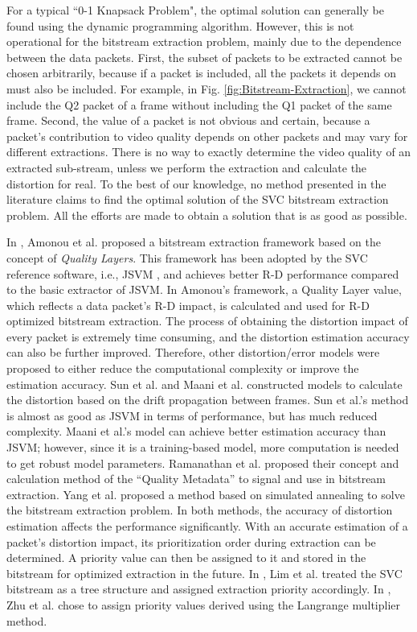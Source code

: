 \documentclass[journal,draftclsnofoot,onecolumn]{IEEEtran}
\begin{document}
For a typical ``0-1 Knapsack Problem", the optimal solution can generally be found using the dynamic programming algorithm. However, this is not operational for the bitstream extraction problem, mainly due to the dependence between the data packets. First, the subset of packets to be extracted cannot be chosen arbitrarily, because if a packet is included, all the packets it depends on must also be included. For example, in Fig. \ref{fig:Bitstream-Extraction}, we cannot include the Q2 packet of a frame without including the Q1 packet of the same frame. Second, the value of a packet is not obvious and certain, because a packet's contribution to video quality depends on other packets and may vary for different extractions. There is no way to exactly determine the video quality of an extracted sub-stream, unless we perform the extraction and calculate the distortion for real. To the best of our knowledge, no method presented in the literature claims to find the optimal solution of the SVC bitstream extraction problem. All the efforts are made to obtain a solution that is as good as possible.

In \cite{Amonou07}, Amonou et al. proposed a bitstream extraction framework based on the concept of \textit{Quality Layers}. This framework has been adopted by the SVC reference software, i.e., JSVM \cite{JSVM}, and achieves better R-D performance compared to the basic extractor of JSVM. In Amonou's framework, a Quality Layer value, which reflects a data packet's R-D impact, is calculated and used for R-D optimized bitstream extraction. The process of obtaining the distortion impact of every packet is extremely time consuming, and the distortion estimation accuracy can also be further improved. Therefore, other distortion/error models were proposed to either reduce the computational complexity or improve the estimation accuracy. Sun et al. \cite{Sun09} and Maani et al. \cite{Maani09} constructed models to calculate the distortion based on the drift propagation between frames. Sun et al.'s method is almost as good as JSVM in terms of performance, but has much reduced complexity. Maani et al.'s model can achieve better estimation accuracy than JSVM; however, since it is a training-based model, more computation is needed to get robust model parameters. Ramanathan et al. \cite{Ramanathan12} proposed their concept and calculation method of the ``Quality Metadata'' to signal and use in bitstream extraction. Yang et al. \cite{Yang13} proposed a method based on simulated annealing to solve the bitstream extraction problem. In both methods, the accuracy of distortion estimation affects the performance significantly. With an accurate estimation of a packet's distortion impact, its prioritization order during extraction can be determined. A priority value can then be assigned to it and stored in the bitstream for optimized extraction in the future. In \cite{Lim06}, Lim et al. treated the SVC bitstream as a tree structure and assigned extraction priority accordingly. In \cite{Zhu11}, Zhu et al. chose to assign priority values derived using the Langrange multiplier method.
\end{document}
